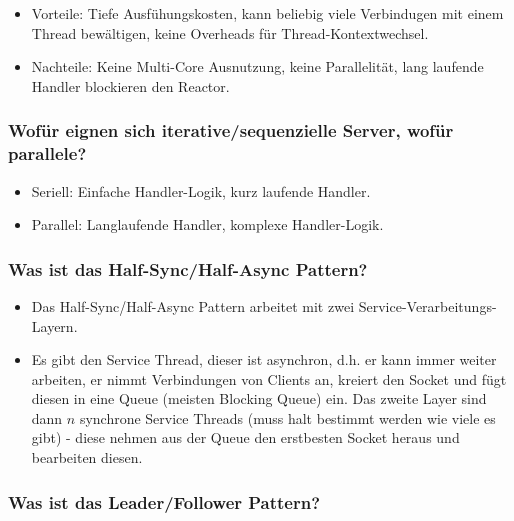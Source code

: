 \documentclass[10pt,a4paper]{scrartcl}
\begin{document}
\begin{itemize}
	\item Vorteile: Tiefe Ausfühungskosten, kann beliebig viele Verbindugen mit einem Thread
		bewältigen, keine Overheads für Thread-Kontextwechsel.
	\item Nachteile: Keine Multi-Core Ausnutzung, keine Parallelität, lang laufende Handler blockieren
		den Reactor.
\end{itemize}

\subsubsection{Wofür eignen sich iterative/sequenzielle Server, wofür parallele?}

\begin{itemize}
	\item Seriell: Einfache Handler-Logik, kurz laufende Handler.
	\item Parallel: Langlaufende Handler, komplexe Handler-Logik.
\end{itemize}

\subsubsection{Was ist das Half-Sync/Half-Async Pattern?}

\begin{itemize}
	\item Das Half-Sync/Half-Async Pattern arbeitet mit zwei Service-Verarbeitungs-Layern.
	\item Es gibt den Service Thread, dieser ist asynchron, d.h. er kann immer weiter arbeiten, er
		nimmt Verbindungen von Clients an, kreiert den Socket und fügt diesen in eine Queue (meisten
		Blocking Queue) ein. Das zweite Layer sind dann $n$ synchrone Service Threads (muss halt bestimmt
		werden wie viele es gibt) - diese nehmen aus der Queue den erstbesten Socket heraus und
		bearbeiten diesen.
\end{itemize}

\subsubsection{Was ist das Leader/Follower Pattern?}
\end{document}
